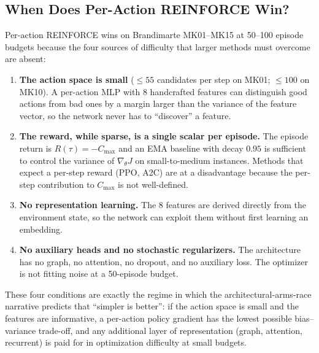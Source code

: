 \documentclass[10pt]{article}
\theoremstyle{definition}
\begin{document}
\subsection{When Does Per-Action REINFORCE Win?}
\label{sec:wins-loses}

Per-action REINFORCE wins on Brandimarte MK01--MK15 at
50--100 episode budgets because the four sources of
difficulty that larger methods must overcome are
absent:
\begin{enumerate}
  \item \textbf{The action space is small} ($\leq 55$ candidates
        per step on MK01; $\leq 100$ on MK10). A per-action MLP
        with 8 handcrafted features can distinguish good actions
        from bad ones by a margin larger than the variance of
        the feature vector, so the network never has to
        ``discover'' a feature.
  \item \textbf{The reward, while sparse, is a single scalar
        per episode.} The episode return is $R(\tau) = -C_{\max}$
        and an EMA baseline with decay $0.95$ is sufficient to
        control the variance of $\nabla_\theta J$ on
        small-to-medium instances. Methods that expect a
        per-step reward (PPO, A2C) are at a disadvantage
        because the per-step contribution to $C_{\max}$ is not
        well-defined.
  \item \textbf{No representation learning.} The 8 features
        are derived directly from the environment state, so
        the network can exploit them without first learning
        an embedding.
  \item \textbf{No auxiliary heads and no stochastic
        regularizers.} The architecture has no graph, no
        attention, no dropout, and no auxiliary loss. The
        optimizer is not fitting noise at a 50-episode budget.
\end{enumerate}
These four conditions are exactly the regime in which
the architectural-arms-race narrative predicts that
``simpler is better'': if the action space is small and
the features are informative, a per-action policy
gradient has the lowest possible bias--variance
trade-off, and any additional layer of representation
(graph, attention, recurrent) is paid for in
optimization difficulty at small budgets.

\end{document}
